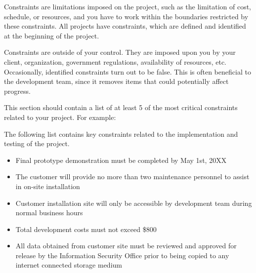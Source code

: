 Constraints are limitations imposed on the project, such as the limitation of cost, schedule, or resources, and you have to work within the boundaries restricted by these constraints. All projects have constraints, which are defined and identified at the beginning of the project.

Constraints are outside of your control. They are imposed upon you by your client, organization, government regulations, availability of resources, etc. Occasionally, identified constraints turn out to be false. This is often beneficial to the development team, since it removes items that could potentially affect progress.

This section should contain a list of at least 5 of the most critical constraints related to your project. For example:

The following list contains key constraints related to the implementation and testing of the project.

\begin{itemize}
  \item Final prototype demonstration must be completed by May 1st, 20XX
  \item The customer will provide no more than two maintenance personnel to assist in on-site installation
  \item Customer installation site will only be accessible by development team during normal business hours
  \item Total development costs must not exceed \$800
  \item All data obtained from customer site must be reviewed and approved for release by the Information Security Office prior to being copied to any internet connected storage medium
\end{itemize}

